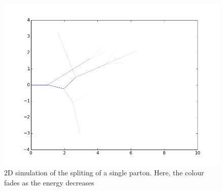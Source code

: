 %
%
\begin{figure}[hbtp]
\centering
\includegraphics[scale=.5]{images/2D_partonshower.png}
\caption{2D simulation of the spliting of a single parton. Here, the colour fades as the energy decreases}\label{fig:2d}
\end{figure}

